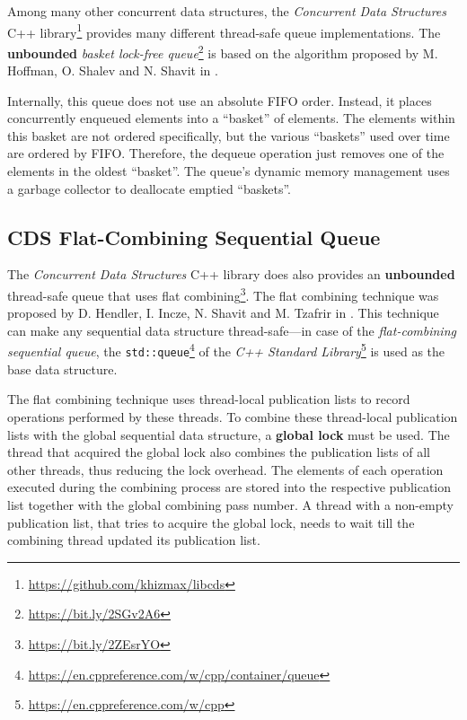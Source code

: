 	Among many other concurrent data structures, the \textit{Concurrent Data Structures} C++ library\footnote{\url{https://github.com/khizmax/libcds}} provides many different thread-safe queue implementations. The \textbf{unbounded} \emph{basket lock-free queue}\footnote{\url{https://bit.ly/2SGv2A6}} is based on the algorithm proposed by M. Hoffman, O. Shalev and N. Shavit in \cite{Hoffman:2007}.
	
	Internally, this queue does not use an absolute FIFO order. Instead, it places concurrently enqueued elements into a ``basket'' of elements. The elements within this basket are not ordered specifically, but the various ``baskets'' used over time are ordered by FIFO. Therefore, the dequeue operation just removes one of the elements in the oldest ``basket''. The queue's dynamic memory management uses a garbage collector to deallocate emptied ``baskets''.

\subsection[CDS FCQueue]{CDS Flat-Combining Sequential Queue} \label{subsec:cds-fc}

	The \textit{Concurrent Data Structures} C++ library does also provides an \textbf{unbounded} thread-safe queue that uses flat combining\footnote{\url{https://bit.ly/2ZEsrYO}}. The flat combining technique was proposed by D. Hendler, I. Incze, N. Shavit and M. Tzafrir in \cite{Hendler:2010}.  This technique can make any sequential data structure thread-safe---in case of the \emph{flat-combining sequential queue}, the \texttt{std::queue}\footnote{\url{https://en.cppreference.com/w/cpp/container/queue}} of the \textit{C++ Standard Library}\footnote{\url{https://en.cppreference.com/w/cpp}} is used as the base data structure.
	
	The flat combining technique uses thread-local publication lists to record operations performed by these threads. To combine these thread-local publication lists with the global sequential data structure, a \textbf{global lock} must be used. The thread that acquired the global lock also combines the publication lists of all other threads, thus reducing the lock overhead. The elements of each operation executed during the combining process are stored into the respective publication list together with the global combining pass number. A thread with a non-empty publication list, that tries to acquire the global lock, needs to wait till the combining thread updated its publication list.

